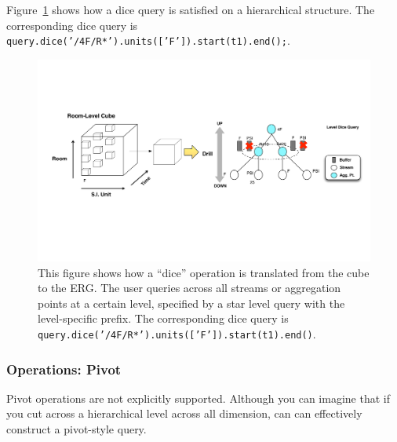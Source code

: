 
Figure~\ref{fig:olapdice2ergdice}
shows how a dice query is satisfied on a hierarchical structure.  The corresponding dice query 
is \texttt{query.dice('/4F/R*').units(['F']).start(t1).end();}.


\begin{figure}[h!] %
\centering
\includegraphics[width=1.0\columnwidth]{figs/olapdice2ergdice}
\caption{This figure shows how a ``dice'' operation is translated from the cube to the ERG.  The user queries across all streams or aggregation
points at a certain level, specified by a star level query with the level-specific prefix.  The corresponding dice query is
\texttt{query.dice('/4F/R*').units(['F']).start(t1).end()}.}
\label{fig:olapdice2ergdice}
\end{figure}




\subsubsection{Operations: Pivot}
Pivot operations are not explicitly supported.  Although you can imagine that if you cut across a hierarchical level across all dimension, can
can effectively construct a pivot-style query.





